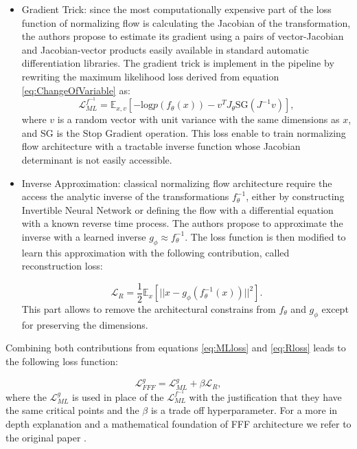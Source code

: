 \begin{itemize}
\item Gradient Trick: since the most computationally expensive part of the loss function of normalizing flow is calculating the Jacobian of the transformation, the authors propose to  estimate its gradient using a pairs of vector-Jacobian and Jacobian-vector products easily available in standard automatic differentiation libraries. The gradient trick is implement in the pipeline by rewriting the maximum likelihood loss derived from equation \ref{eq:ChangeOfVariable} as:
\begin{equation}
        \mathcal{L}_{ML}^{f^{-1}} = \mathbb{E}_{x, v}[-\text{log}p(f_\theta (x)) - v^T J_\theta \text{SG}(J^{-1}v)], 
\label{eq:MLloss}
\end{equation}
where $v$ is a random vector with unit variance with the same dimensions as $x$, and SG is the Stop Gradient operation. This loss enable to train normalizing flow architecture with a tractable inverse function whose Jacobian determinant is not easily accessible.

\item Inverse Approximation: classical normalizing flow architecture require the access the analytic inverse of the transformations $f_\theta^{-1}$, either by constructing Invertible Neural Network or defining the flow with a differential equation with a known reverse time process. The authors propose to approximate the inverse with a learned inverse $g_\phi \approx f_\theta^{-1}$. The loss function is then modified to learn this approximation with the following contribution, called reconstruction loss: 

\begin{equation}
    \mathcal{L}_{R} = \frac{1}{2}\mathbb{E}_{x}[|| x - g_\phi(f^{-1}_\theta (x)) ||^2].
\label{eq:Rloss}
\end{equation}
This part allows to remove the architectural constrains from $f_\theta$ and $g_\phi$ except for preserving the dimensions.
\end{itemize}

Combining both contributions from equations \ref{eq:MLloss} and \ref{eq:Rloss} leads to the following loss function:

\begin{equation}
    \mathcal{L}_{FFF}^g = \mathcal{L}_{ML}^{g} + \beta \mathcal{L}_{R},
\label{eq:FFFloss}
\end{equation}
where the $\mathcal{L}_{ML}^{g}$ is used in place of the $\mathcal{L}_{ML}^{f^{-1}}$ with the justification that they have the same critical points and the $\beta$ is a trade off hyperparameter. For a more in depth explanation and a mathematical foundation of FFF architecture we refer to the original paper \cite{draxlerFreeformFlowsMake2024}. 

